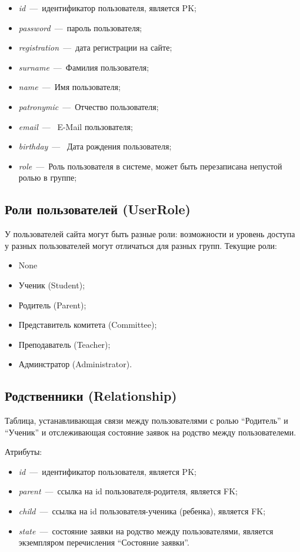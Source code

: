 \documentclass[14pt]{article}
\begin{document}
\begin{itemize}
	\item \emph{id}~---~идентификатор пользователя, является PK;
	\item \emph{password}~---~пароль пользователя;
	\item \emph{registration}~---~дата регистрации на сайте;
	\item \emph{surname}~---~Фамилия пользователя;
	\item \emph{name}~---~Имя пользователя;
	\item \emph{patronymic}~---~Отчество пользователя;
	\item \emph{email}~---~ E-Mail пользователя;
	\item \emph{birthday}~---~ Дата рождения пользователя;
    \item \emph{role}~---~Роль пользователя в системе, может быть перезаписана непустой ролью в группе;
\end{itemize}

\subsection{Роли пользователей (UserRole)}

У пользователей сайта могут быть разные роли: возможности и уровень доступа у разных пользователей могут отличаться для разных групп.
Текущие роли:
\begin{itemize}
    \item None
	\item Ученик (Student);
	\item Родитель (Parent);
	\item Представитель комитета (Committee);
	\item Преподаватель (Teacher);
	\item Админстратор (Administrator).
\end{itemize}

\subsection{Родственники (Relationship)}

Таблица, устанавливающая связи между пользователями с ролью ``Родитель'' и ``Ученик'' и отслеживающая состояние заявок на родство между пользователеми.

Атрибуты:
\begin{itemize}
	\item \emph{id}~---~идентификатор пользователя, является PK;
	\item \emph{parent}~---~ссылка на id пользователя-родителя, является FK;
	\item \emph{child}~---~ссылка на id пользователя-ученика (ребенка), является FK;
	\item \emph{state}~---~состояние заявки на родство между пользователями, является экземпляром перечисления ``Состояние заявки''.
\end{itemize}
\end{document}
